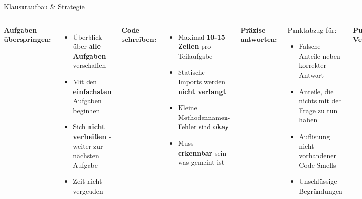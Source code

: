 \begin{frame}{Klausuraufbau \& Strategie}
  \begin{columns}[T]
    \textbf{Aufgaben überspringen:}
    \begin{itemize}
      \item Überblick über \textbf{alle Aufgaben} verschaffen
      \item Mit den \textbf{einfachsten} Aufgaben beginnen
      \item Sich \textbf{nicht verbeißen} - weiter zur nächsten Aufgabe
      \item Zeit nicht vergeuden
    \end{itemize}

    \textbf{Code schreiben:}
    \begin{itemize}
      \item Maximal \textbf{10-15 Zeilen} pro Teilaufgabe
      \item Statische Imports werden \textbf{nicht verlangt}
      \item Kleine Methodennamen-Fehler sind \textbf{okay}
      \item Muss \textbf{erkennbar} sein was gemeint ist
    \end{itemize}

    \textbf{Präzise antworten:}
    \begin{alertblock}{Punktabzug für:}
      \begin{itemize}
        \item Falsche Anteile neben korrekter Antwort
        \item Anteile, die nichts mit der Frage zu tun haben
        \item Auflistung nicht vorhandener Code Smells
        \item Unschlüssige Begründungen
      \end{itemize}
    \end{alertblock}

    \textbf{Punkte-Vergabe:}
    \begin{itemize}
      \item Korreliert \textbf{nicht} mit Arbeitsaufwand
      \item Bezieht sich auf \textbf{fachliche Aspekte}
      \item Jeder Aspekt wird einzeln bewertet
    \end{itemize}
  \end{columns}
\end{frame}


